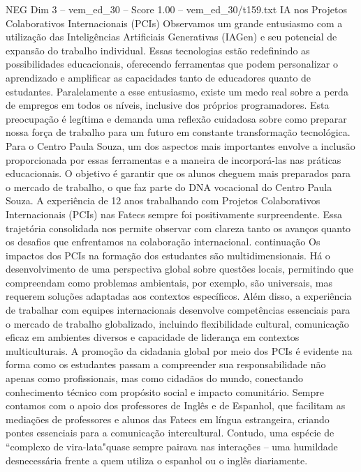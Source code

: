 \begin{textsample}{NEG Dim 3 – vem\_ed\_30 – Score 1.00 – vem\_ed\_30/t159.txt}  \label{ex:f3_neg_045}
IA nos Projetos Colaborativos Internacionais (PCIs) Observamos um grande entusiasmo com a utilização das Inteligências Artificiais Generativas (IAGen) e seu potencial de expansão do trabalho individual.
Essas tecnologias estão redefinindo as possibilidades educacionais, oferecendo ferramentas que podem personalizar o aprendizado e amplificar as capacidades tanto de educadores quanto de estudantes.
Paralelamente a esse entusiasmo, existe um medo real sobre a perda de empregos em todos os níveis, inclusive dos próprios programadores.
Esta preocupação é legítima e demanda uma reflexão cuidadosa sobre como preparar nossa força de trabalho para um futuro em constante transformação tecnológica.
Para o Centro Paula Souza, um dos aspectos mais importantes envolve a inclusão proporcionada por essas ferramentas e a maneira de incorporá-las nas práticas educacionais.
O objetivo é garantir que os alunos cheguem mais preparados para o mercado de trabalho, o que faz parte do DNA vocacional do Centro Paula Souza.
A experiência de 12 anos trabalhando com Projetos Colaborativos Internacionais (PCIs) nas Fatecs sempre foi positivamente surpreendente.
Essa trajetória consolidada nos permite observar com clareza tanto os avanços quanto os desafios que enfrentamos na colaboração internacional. continuação Os impactos dos PCIs na formação dos estudantes são multidimensionais.
Há o desenvolvimento de uma perspectiva global sobre questões locais, permitindo que compreendam como problemas ambientais, por exemplo, são universais, mas requerem soluções adaptadas aos contextos específicos.
Além disso, a experiência de trabalhar com equipes internacionais desenvolve competências essenciais para o mercado de trabalho globalizado, incluindo flexibilidade cultural, comunicação eficaz em ambientes diversos e capacidade de liderança em contextos multiculturais.
A promoção da cidadania global por meio dos PCIs é evidente na forma como os estudantes passam a compreender sua responsabilidade não apenas como profissionais, mas como cidadãos do mundo, conectando conhecimento técnico com propósito social e impacto comunitário.
Sempre contamos com o apoio dos professores de Inglês e de Espanhol, que facilitam as mediações de professores e alunos das Fatecs em língua estrangeira, criando pontes essenciais para a comunicação intercultural.
Contudo, uma espécie de “complexo de vira-lata"quase sempre pairava nas interações – uma humildade desnecessária frente a quem utiliza o espanhol ou o inglês diariamente.

\end{textsample}
